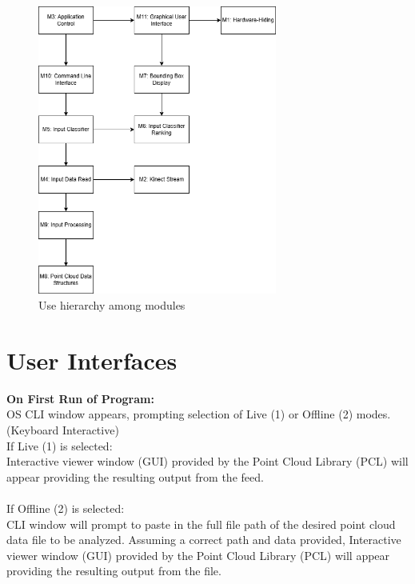 \documentclass[12pt, titlepage]{article}
\begin{document}
\begin{figure}[H]
\centering
\includegraphics[width=0.7\textwidth]{ModuleHierarchy.png}
\caption{Use hierarchy among modules}
\label{FigUH}
\end{figure}


\section{User Interfaces}

\noindent \textbf{On First Run of Program:}\\
OS CLI window appears, prompting selection of Live (1) or Offline (2) modes. (Keyboard Interactive)\\

\noindent If Live (1) is selected:\\
Interactive viewer window (GUI) provided by the Point Cloud Library (PCL) will appear providing the resulting output from the feed.\\
\\

\noindent If Offline (2) is selected:\\
CLI window will prompt to paste in the full file path of the desired point cloud data file to be analyzed. 
Assuming a correct path and data provided, Interactive viewer window (GUI) provided by the Point Cloud Library (PCL) will appear providing the resulting output from the file.\\
\end{document}
